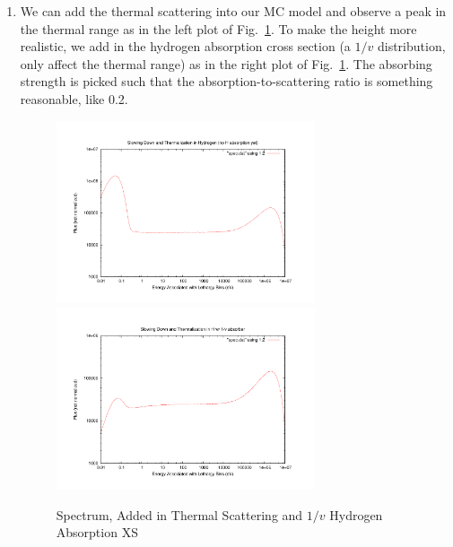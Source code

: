 \documentclass{school-22.211-notes}
\begin{document}
\begin{enumerate}
\begin{enumerate}
\item We can add the thermal scattering into our MC model and observe a peak in the thermal range as in the left plot of Fig.~\ref{spe2}. To make the height more realistic, we add in the hydrogen absorption cross section (a $1/v$ distribution, only affect the thermal range) as in the right plot of Fig.~\ref{spe2}. The absorbing strength is picked such that the absorption-to-scattering ratio is something reasonable, like 0.2. 
\begin{figure}[ht]
  \centering
  \includegraphics[width=3in]{images/sl-d/spec-4.uncrop.pdf}
  \includegraphics[width=3in]{images/sl-d/spec-5.uncrop.pdf}
  \caption{Spectrum, Added in Thermal Scattering and $1/v$ Hydrogen Absorption XS} \label{spe2}
\end{figure}
\end{enumerate}


\end{enumerate}
\end{document}
